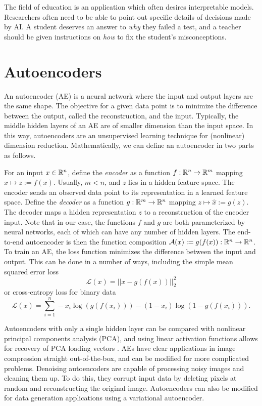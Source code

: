 The field of education is an application which often desires interpretable models. Researchers often need to be able to point out specific details of decisions made by AI. A student deserves an answer to \textit{why} they failed a test, and a teacher should be given instructions on \textit{how} to fix the student's misconceptions.

\section{Autoencoders}
An autoencoder (AE) is a neural network where the input and output layers are the same shape. The objective for a given data point is to minimize the difference between the output, called the reconstruction, and the input. Typically, the middle hidden layers of an AE are of smaller dimension than the input space. In this way, autoencoders are an unsupervised learning technique for (nonlinear) dimension reduction. Mathematically, we can define an autoencoder in two parts as follows.

For an input $x \in \mathbb{R}^n$, define the \textit{encoder} as a function $f: \mathbb{R}^n \to \mathbb{R}^m$ mapping $x \mapsto z := f(x)$. Usually, $m < n$, and $z$ lies in a hidden feature space. The encoder sends an observed data point to its representation in a learned feature space. Define the \textit{decoder} as a function $g: \mathbb{R}^m \to \mathbb{R}^n$ mapping $z \mapsto \hat x := g(z)$. The decoder maps a hidden representation $z$ to a reconstruction of the encoder input. Note that in our case, the functions $f$ and $g$ are both parameterized by neural networks, each of which can have any number of hidden layers. The end-to-end autoencoder is then the function composition $\mathcal{A}(x):= g(f(x)): \mathbb{R}^n \to \mathbb{R}^n$. To train an AE, the loss function minimizes the difference between the input and output. This can be done in a number of ways, including the simple mean squared error loss
\begin{equation}
  \mathcal{L}(x) = || x - g(f(x))||_2^2
  \label{eq:mse}
\end{equation}
or cross-entropy loss for binary data
\begin{equation}
  \mathcal{L}(x) = \sum_{i=1}^n - x_i \log(g(f(x_i))) - (1-x_i)\log(1- g(f(x_i))).
  \label{eq:cross_entropy}
\end{equation}

Autoencoders with only a single hidden layer can be compared with nonlinear principal components analysis (PCA), and using linear activation functions allows for recovery of PCA loading vectors \cite{plaut2018}. AEs have clear applications in image compression straight out-of-the-box, and can be modified for more complicated problems. Denoising autoencoders \cite{vincent2008} are capable of processing noisy images and cleaning them up. To do this, they corrupt input data by deleting pixels at random and reconstructing the original image. Autoencoders can also be modified for data generation applications using a variational autoencoder.

